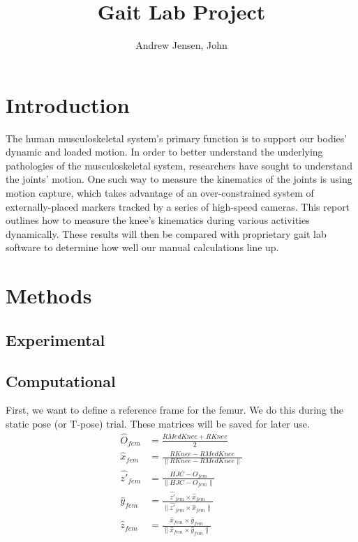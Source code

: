\documentclass{article}
\title{Gait Lab Project}
\author{Andrew Jensen, John}
\begin{document}
\maketitle
    \section{Introduction}
    The human musculoskeletal system's primary function is to support our bodies' dynamic and loaded motion. In order to better understand the underlying pathologies of the musculoskeletal system, researchers have sought to understand the joints' motion. One such way to measure the kinematics of the joints is using motion capture, which takes advantage of an over-constrained system of externally-placed markers tracked by a series of high-speed cameras. This report outlines how to measure the knee's kinematics during various activities dynamically. These results will then be compared with proprietary gait lab software to determine how well our manual calculations line up.

    \section{Methods}
    \subsection{Experimental}
    \subsection{Computational}
    First, we want to define a reference frame for the femur. We do this during the static pose (or T-pose) trial. These matrices will be saved for later use.
\begin{equation}
    \begin{aligned}
        \hat{O}_{fem} &= \frac{RMedKnee + RKnee}{2}\\
        \hat{x}_{fem} & = \frac{RKnee - RMedKnee}{\|RKnee - RMedKnee\|} \\
        \hat{z'}_{fem} &= \frac{HJC - O_{fem}}{\|HJC - O_{fem}\|} \\
        \hat{y}_{fem} &= \frac{\hat{z'}_{fem} \times \hat{x}_{fem}}{\|\hat{z'}_{fem} \times \hat{x}_{fem}\|} \\
        \hat{z}_{fem} & = \frac{\hat{x}_{fem} \times \hat{y}_{fem}}{\|\hat{x}_{fem} \times \hat{y}_{fem}\|}
    \end{aligned}
    \label{fem_rf}
\end{equation}
    
\end{document}
